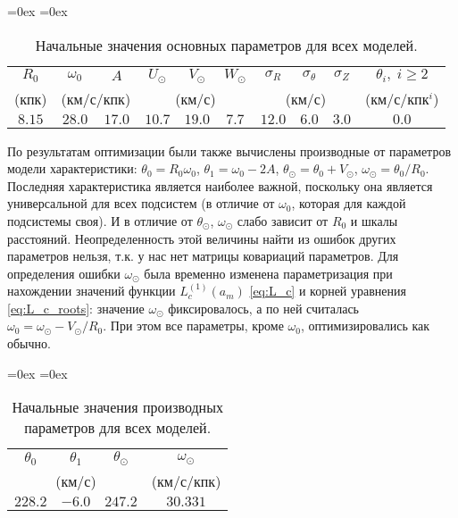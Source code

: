 \documentclass[a4paper, oneside, 14pt]{article}
\begin{document}
\begin{table}[H]
  \centering
  \aboverulesep=0ex
  \belowrulesep=0ex
  \renewcommand{\arraystretch}{1.25}
  \renewcommand\cellset{\renewcommand{\arraystretch}{0.7}}
  \begin{tabular}{cccccccccc}
    \toprule
    $ R_0 $ & $ \omega_0 $ & $ A $ & $ U_\odot $ & $ V_\odot $ & $ W_\odot $ & $ \sigma_R $ & $ \sigma_\theta $ & $ \sigma_Z $ & $ \theta_i, \; i \ge 2 $ \\
    (кпк) & \multicolumn{2}{c}{(км/с/кпк)} & \multicolumn{3}{c}{(км/с)} & \multicolumn{3}{c}{(км/с)} & (км/с/кпк$^i$) \\
    \midrule
    $ 8.15 $ & $ 28.0 $ & $ 17.0 $ & $ 10.7 $ & $ 19.0 $ & $ 7.7 $ & $ 12.0 $ & $ 6.0 $ & $ 3.0 $ & $ 0.0 $ \\
    \bottomrule
  \end{tabular}
  \caption{Начальные значения основных параметров для всех моделей.}
\end{table}

По результатам оптимизации были также вычислены производные от параметров модели характеристики: $ \theta_0 = R_0 \omega_0 $, $ \theta_1 = \omega_0 - 2 A $, $ \theta_\odot = \theta_0 + V_\odot $, $ \omega_\odot = \theta_0 / R_0 $. Последняя характеристика является наиболее важной, поскольку она является универсальной для всех подсистем (в отличие от $ \omega_0 $, которая для каждой подсистемы своя). И в отличие от $ \theta_\odot $, $ \omega_\odot $ слабо зависит от $ R_0 $ и шкалы расстояний. Неопределенность этой величины найти из ошибок других параметров нельзя, т.к. у нас нет матрицы ковариаций параметров. Для определения ошибки $ \omega_\odot $ была временно изменена параметризация при нахождении значений функции $ L_c^{(1)}(a_m) $ \eqref{eq:L_c} и корней уравнения \eqref{eq:L_c_roots}: значение $ \omega_\odot $ фиксировалось, а по ней считалась $ \omega_0 = \omega_\odot - V_\odot / R_0 $. При этом все параметры, кроме $ \omega_0 $, оптимизировались как обычно.
%
\begin{table}[H]
  \centering
  \aboverulesep=0ex
  \belowrulesep=0ex
  \renewcommand{\arraystretch}{1.25}
  \renewcommand\cellset{\renewcommand{\arraystretch}{0.7}}
  \begin{tabular}{cccc}
    \toprule
    $ \theta_0 $ & $ \theta_1 $ & $ \theta_\odot $ & $ \omega_\odot $ \\
    \multicolumn{3}{c}{(км/с)} & (км/с/кпк) \\
    \midrule
    $ 228.2 $ & $ -6.0 $ & $ 247.2 $ & $ 30.331 $ \\
    \bottomrule
  \end{tabular}
  \caption{Начальные значения производных параметров для всех моделей.}
\end{table}
\end{document}
